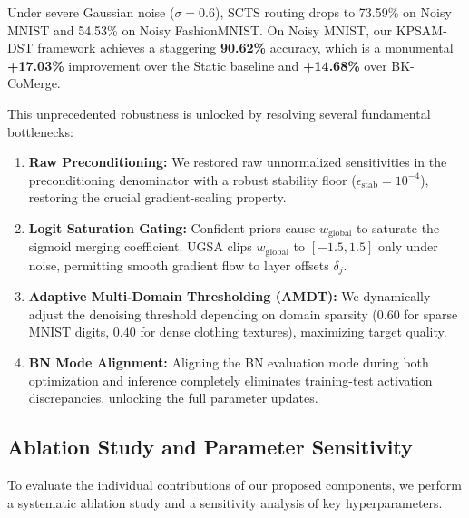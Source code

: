 \documentclass{article}
\theoremstyle{plain}
\theoremstyle{definition}
\theoremstyle{remark}
\begin{document}
Under severe Gaussian noise ($\sigma = 0.6$), SCTS routing drops to 73.59\% on Noisy MNIST and 54.53\% on Noisy FashionMNIST. On Noisy MNIST, our KPSAM-DST framework achieves a staggering \textbf{90.62\%} accuracy, which is a monumental \textbf{+17.03\%} improvement over the Static baseline and \textbf{+14.68\%} over BK-CoMerge.

This unprecedented robustness is unlocked by resolving several fundamental bottlenecks:
\begin{enumerate}
    \item \textbf{Raw Preconditioning:} We restored raw unnormalized sensitivities in the preconditioning denominator with a robust stability floor ($\epsilon_{\text{stab}} = 10^{-4}$), restoring the crucial gradient-scaling property.
    \item \textbf{Logit Saturation Gating:} Confident priors cause $w_{\text{global}}$ to saturate the sigmoid merging coefficient. UGSA clips $w_{\text{global}}$ to $[-1.5, 1.5]$ only under noise, permitting smooth gradient flow to layer offsets $\delta_j$.
    \item \textbf{Adaptive Multi-Domain Thresholding (AMDT):} We dynamically adjust the denoising threshold depending on domain sparsity ($0.60$ for sparse MNIST digits, $0.40$ for dense clothing textures), maximizing target quality.
    \item \textbf{BN Mode Alignment:} Aligning the BN evaluation mode during both optimization and inference completely eliminates training-test activation discrepancies, unlocking the full parameter updates.
\end{enumerate}

\subsection{Ablation Study and Parameter Sensitivity}
To evaluate the individual contributions of our proposed components, we perform a systematic ablation study and a sensitivity analysis of key hyperparameters. 
\end{document}
